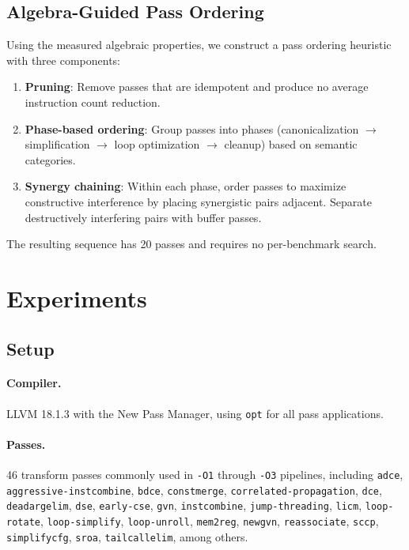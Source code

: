 \documentclass[11pt]{article}
\begin{document}
\subsection{Algebra-Guided Pass Ordering}
\label{sec:ordering}

Using the measured algebraic properties, we construct a pass ordering heuristic with three components:
\begin{enumerate}[nosep]
  \item \textbf{Pruning}: Remove passes that are idempotent and produce no average instruction count reduction.
  \item \textbf{Phase-based ordering}: Group passes into phases (canonicalization $\to$ simplification $\to$ loop optimization $\to$ cleanup) based on semantic categories.
  \item \textbf{Synergy chaining}: Within each phase, order passes to maximize constructive interference by placing synergistic pairs adjacent. Separate destructively interfering pairs with buffer passes.
\end{enumerate}
The resulting sequence has 20 passes and requires no per-benchmark search.

\section{Experiments}
\label{sec:experiments}

\subsection{Setup}

\paragraph{Compiler.} LLVM 18.1.3 with the New Pass Manager, using \texttt{opt} for all pass applications.

\paragraph{Passes.} 46 transform passes commonly used in \texttt{-O1} through \texttt{-O3} pipelines, including \texttt{adce}, \texttt{aggressive-instcombine}, \texttt{bdce}, \texttt{constmerge}, \texttt{correlated-propagation}, \texttt{dce}, \texttt{deadargelim}, \texttt{dse}, \texttt{early-cse}, \texttt{gvn}, \texttt{instcombine}, \texttt{jump-threading}, \texttt{licm}, \texttt{loop-rotate}, \texttt{loop-simplify}, \texttt{loop-unroll}, \texttt{mem2reg}, \texttt{newgvn}, \texttt{reassociate}, \texttt{sccp}, \texttt{simplifycfg}, \texttt{sroa}, \texttt{tailcallelim}, among others.
\end{document}
